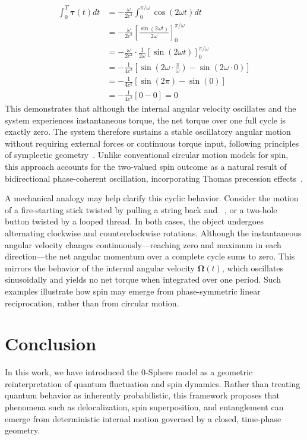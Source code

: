 \documentclass[%
 reprint,
 amsmath,amssymb,
 aps,
]{revtex4-1}
\numberwithin{equation}{section}%
\begin{document}
\begin{align}
\int_0^T \boldsymbol{\tau}(t) dt &= -\frac{\omega}{2c^2} \int_0^{\pi/\omega} \cos(2\omega t) dt \\
&= -\frac{\omega}{2c^2} \left[ \frac{\sin(2\omega t)}{2\omega} \right]_0^{\pi/\omega} \nonumber \\
&= -\frac{\omega}{2c^2} \cdot \frac{1}{2\omega} \left[ \sin(2\omega t) \right]_0^{\pi/\omega} \nonumber \\
&= -\frac{1}{4c^2} \left[ \sin\left(2\omega \cdot \frac{\pi}{\omega}\right) - \sin(2\omega \cdot 0) \right] \nonumber \\
&= -\frac{1}{4c^2} \left[ \sin(2\pi) - \sin(0) \right] \nonumber \\
&= -\frac{1}{4c^2} \left[ 0 - 0 \right] = 0 \nonumber
\label{eq:torque_integration_zero}
\end{align}
This demonstrates that although the internal angular velocity oscillates and the system experiences instantaneous torque, the net torque over one full cycle is exactly zero. The system therefore sustains a stable oscillatory angular motion without requiring external forces or continuous torque input, following principles of symplectic geometry~\cite{arnold1989}. Unlike conventional circular motion models for spin, this approach accounts for the two-valued spin outcome as a natural result of bidirectional phase-coherent oscillation, incorporating Thomas precession effects~\cite{thomas1926}.

A mechanical analogy may help clarify this cyclic behavior. Consider the motion of a fire-starting stick twisted by pulling a string back and ~\cite{goldstein2001}, or a two-hole button twisted by a looped thread. In both cases, the object undergoes alternating clockwise and counterclockwise rotations. Although the instantaneous angular velocity changes continuously—reaching zero and maximum in each direction—the net angular momentum over a complete cycle sums to zero. This mirrors the behavior of the internal angular velocity $\boldsymbol{\Omega}(t)$, which oscillates sinusoidally and yields no net torque when integrated over one period. Such examples illustrate how spin may emerge from phase-symmetric linear reciprocation, rather than from circular motion.


\section{Conclusion}

In this work, we have introduced the 0-Sphere model as a geometric reinterpretation of quantum fluctuation and spin dynamics. Rather than treating quantum behavior as inherently probabilistic, this framework proposes that phenomena such as delocalization, spin superposition, and entanglement can emerge from deterministic internal motion governed by a closed, time-phase geometry.
\end{document}
